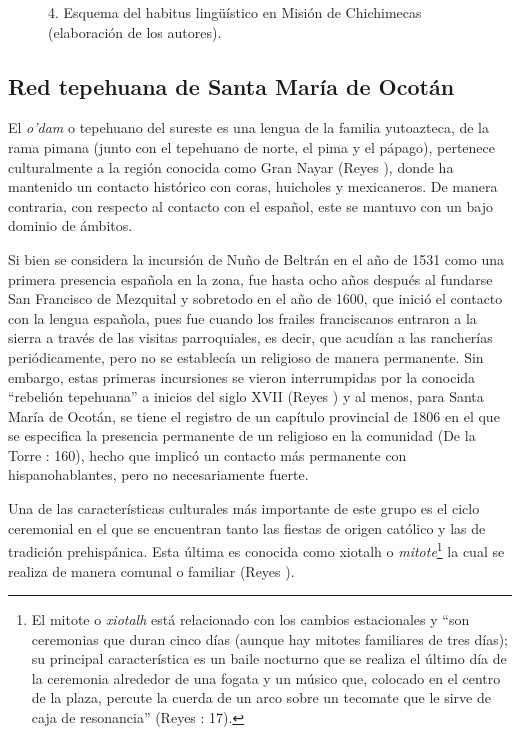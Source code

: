 \documentclass[output=paper]{../langscibook}
\begin{document}
\begin{figure}
\caption{\label{fig:}4. Esquema del habitus lingüístico en Misión de Chichimecas (elaboración de los autores).}
\end{figure}



 \subsection{Red tepehuana de Santa María de Ocotán}



El \textit{o’dam} o tepehuano del sureste es una lengua de la familia yutoazteca, de la rama pimana (junto con el tepehuano de norte, el pima y el pápago), pertenece culturalmente a la región conocida como Gran Nayar (Reyes \citealt{Valdez2006a}), donde ha mantenido un contacto histórico con coras, huicholes y mexicaneros. De manera contraria, con respecto al contacto con el español, este se mantuvo con un bajo dominio de ámbitos.

Si bien se considera la incursión de Nuño de Beltrán en el año de 1531 como una primera presencia española en la zona, fue hasta ocho años después al fundarse San Francisco de Mezquital y sobretodo en el año de 1600, que inició el contacto con la lengua española, pues fue cuando los frailes franciscanos entraron a la sierra a través de las visitas parroquiales, es decir, que acudían a las rancherías periódicamente, pero no se establecía un religioso de manera permanente. Sin embargo, estas primeras incursiones se vieron interrumpidas por la conocida “rebelión tepehuana” a inicios del siglo XVII (Reyes \citealt{Valdez2006a}) y al menos, para Santa María de Ocotán, se tiene el registro de un capítulo provincial de 1806 en el que se especifica la presencia permanente de un religioso en la comunidad (De la Torre \citealt{Curiel2006}: 160), hecho que implicó un contacto más permanente con hispanohablantes, pero no necesariamente fuerte.

Una de las características culturales más importante de este grupo es el ciclo ceremonial en el que se encuentran tanto las fiestas de origen católico y las de tradición prehispánica. Esta última es conocida como xiotalh o \textit{mitote}\footnote{El mitote o \textit{xiotalh} está relacionado con los cambios estacionales y “son ceremonias que duran cinco días (aunque hay mitotes familiares de tres días); su principal característica es un baile nocturno que se realiza el último día de la ceremonia alrededor de una fogata y un músico que, colocado en el centro de la plaza, percute la cuerda de un arco sobre un tecomate que le sirve de caja de resonancia” (Reyes \citealt{Valdez2006b}: 17).} la cual se realiza de manera comunal o familiar (Reyes \citealt{Valdez2006b,2006a2006b}).
\end{document}
